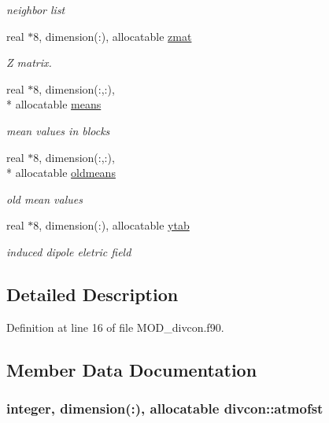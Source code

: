 \begin{DoxyCompactItemize}
\begin{DoxyCompactList}\small\item\em neighbor list \end{DoxyCompactList}\item 
real $\ast$8, dimension(\-:), allocatable \hyperlink{classdivcon_a938a321986541d17214d4e59cab4ea34}{zmat}
\begin{DoxyCompactList}\small\item\em Z matrix. \end{DoxyCompactList}\item 
real $\ast$8, dimension(\-:,\-:), \\*
allocatable \hyperlink{classdivcon_a496460c2cb95e37ebd638af57e4cc0b2}{means}
\begin{DoxyCompactList}\small\item\em mean values in blocks \end{DoxyCompactList}\item 
real $\ast$8, dimension(\-:,\-:), \\*
allocatable \hyperlink{classdivcon_ae489384938cb29894a602cbf5579eab9}{oldmeans}
\begin{DoxyCompactList}\small\item\em old mean values \end{DoxyCompactList}\item 
real $\ast$8, dimension(\-:), allocatable \hyperlink{classdivcon_a1ba68250378b2f3d3274028c30a0c365}{ytab}
\begin{DoxyCompactList}\small\item\em induced dipole eletric field \end{DoxyCompactList}\end{DoxyCompactItemize}


\subsection{Detailed Description}


Definition at line 16 of file M\-O\-D\-\_\-divcon.\-f90.



\subsection{Member Data Documentation}
\hypertarget{classdivcon_afe6c08bc2376eec7662edfe9cc98de07}{
\subsubsection[{atmofst}]{\setlength{\rightskip}{0pt plus 5cm}integer, dimension(\-:), allocatable divcon\-::atmofst}}\label{classdivcon_afe6c08bc2376eec7662edfe9cc98de07}


